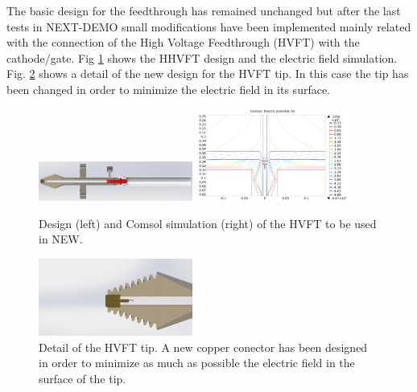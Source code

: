 The basic design for the feedthrough has remained unchanged but after the last tests in NEXT-DEMO small modifications have been implemented mainly related with the connection of the High Voltage Feedthrough (HVFT) with the cathode/gate. Fig \ref{fig:hvft1} shows the HHVFT design and the electric field simulation. Fig. \ref{fig:hvft_tip} shows a detail of the new design for the HVFT tip. In this case the tip has been changed in order to minimize the electric field in its surface.


\begin{figure}[h!]
\centering
\includegraphics[width=0.45\textwidth]{img/HVFT_full_image.jpg}
\includegraphics[width=0.45\textwidth]{img/HVFT_with_drift.png}
\caption{Design (left) and Comsol simulation (right) of the HVFT to be used in NEW.} \label{fig:hvft1}
\end{figure}


\begin{figure}[h!]
\centering
\includegraphics[width=0.45\textwidth]{img/HVFT_tip_detail.jpg}
\caption{Detail of the HVFT tip. A new  copper conector has been designed in order to minimize as much as possible the electric field in the surface of the tip.} \label{fig:hvft_tip}
\end{figure}

%


